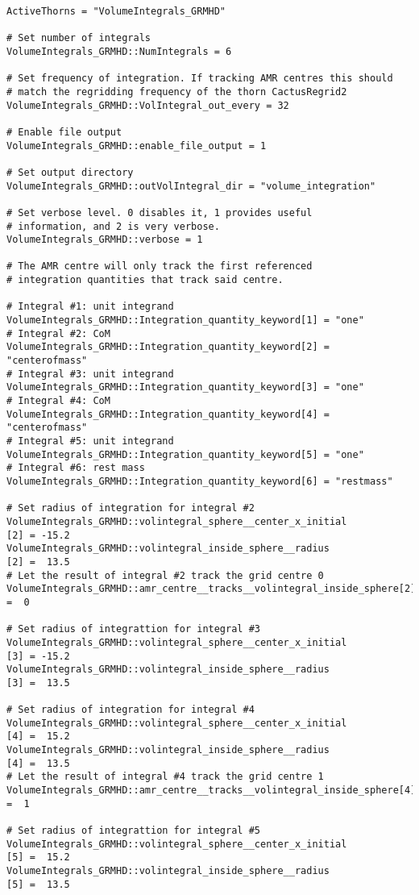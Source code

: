 \begin{verbatim}
ActiveThorns = "VolumeIntegrals_GRMHD"

# Set number of integrals
VolumeIntegrals_GRMHD::NumIntegrals = 6

# Set frequency of integration. If tracking AMR centres this should
# match the regridding frequency of the thorn CactusRegrid2
VolumeIntegrals_GRMHD::VolIntegral_out_every = 32

# Enable file output
VolumeIntegrals_GRMHD::enable_file_output = 1

# Set output directory
VolumeIntegrals_GRMHD::outVolIntegral_dir = "volume_integration"

# Set verbose level. 0 disables it, 1 provides useful
# information, and 2 is very verbose.
VolumeIntegrals_GRMHD::verbose = 1

# The AMR centre will only track the first referenced
# integration quantities that track said centre.

# Integral #1: unit integrand
VolumeIntegrals_GRMHD::Integration_quantity_keyword[1] = "one"
# Integral #2: CoM
VolumeIntegrals_GRMHD::Integration_quantity_keyword[2] = "centerofmass"
# Integral #3: unit integrand
VolumeIntegrals_GRMHD::Integration_quantity_keyword[3] = "one"
# Integral #4: CoM
VolumeIntegrals_GRMHD::Integration_quantity_keyword[4] = "centerofmass"
# Integral #5: unit integrand
VolumeIntegrals_GRMHD::Integration_quantity_keyword[5] = "one"
# Integral #6: rest mass
VolumeIntegrals_GRMHD::Integration_quantity_keyword[6] = "restmass"

# Set radius of integration for integral #2
VolumeIntegrals_GRMHD::volintegral_sphere__center_x_initial         [2] = -15.2
VolumeIntegrals_GRMHD::volintegral_inside_sphere__radius            [2] =  13.5
# Let the result of integral #2 track the grid centre 0
VolumeIntegrals_GRMHD::amr_centre__tracks__volintegral_inside_sphere[2] =  0

# Set radius of integrattion for integral #3
VolumeIntegrals_GRMHD::volintegral_sphere__center_x_initial         [3] = -15.2
VolumeIntegrals_GRMHD::volintegral_inside_sphere__radius            [3] =  13.5

# Set radius of integration for integral #4
VolumeIntegrals_GRMHD::volintegral_sphere__center_x_initial         [4] =  15.2
VolumeIntegrals_GRMHD::volintegral_inside_sphere__radius            [4] =  13.5
# Let the result of integral #4 track the grid centre 1
VolumeIntegrals_GRMHD::amr_centre__tracks__volintegral_inside_sphere[4] =  1

# Set radius of integrattion for integral #5
VolumeIntegrals_GRMHD::volintegral_sphere__center_x_initial         [5] =  15.2
VolumeIntegrals_GRMHD::volintegral_inside_sphere__radius            [5] =  13.5
\end{verbatim}


